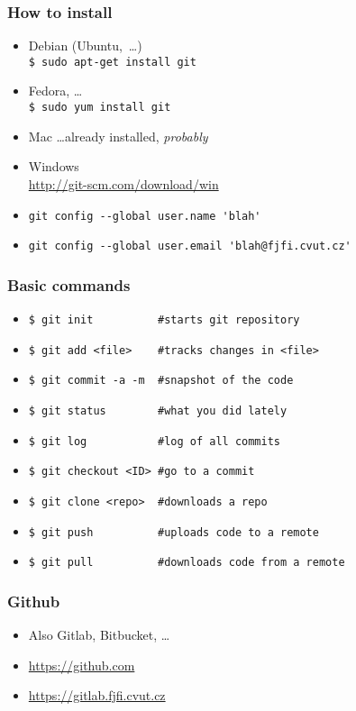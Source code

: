 \documentclass{beamer}
\begin{document}
\begin{frame}[fragile]
\frametitle{How to install}
\begin{itemize}
 \item Debian (Ubuntu,~\dots)\\
 \verb=$ sudo apt-get install git=
 \item Fedora, \dots\\
 \verb=$ sudo yum install git=
 \item Mac \dots already installed, \textit{probably}
 \item Windows\\
 \url{http://git-scm.com/download/win}\\[.5cm]\pause
 \item \verb=git config --global user.name 'blah'=
 \item \verb=git config --global user.email 'blah@fjfi.cvut.cz'=

 
\end{itemize}

\end{frame}

\begin{frame}[fragile]
\frametitle{Basic commands}
\begin{itemize}
\item \verb=$ git init          #starts git repository=\pause
\item \verb=$ git add <file>    #tracks changes in <file>=\pause
\item \verb=$ git commit -a -m  #snapshot of the code=\pause
\item \verb=$ git status        #what you did lately=\pause
\item \verb=$ git log           #log of all commits=\pause
\item \verb=$ git checkout <ID> #go to a commit=\pause
\item \verb=$ git clone <repo>  #downloads a repo=\pause
\item \verb=$ git push          #uploads code to a remote=\pause
\item \verb=$ git pull          #downloads code from a remote=
\end{itemize}

\end{frame}

\begin{frame}[fragile]
\frametitle{Github}
\begin{itemize}
\item Also Gitlab, Bitbucket, \dots
\item \url{https://github.com}
\item \url{https://gitlab.fjfi.cvut.cz}
\end{itemize}

\end{frame}
\end{document}
